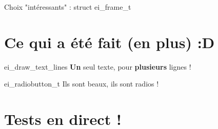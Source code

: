 \documentclass[10pt]{beamer}
\begin{document}
\begin{frame}{Choix "intéressants" : struct ei\_frame\_t}
    \begin{center}
        
    \end{center}
\end{frame}

\section{Ce qui a été fait (en plus) :D}

\begin{frame}{ei\_draw\_text\_lines}
    \textbf{Un} seul texte, pour \textbf{plusieurs} lignes !
\end{frame}


\begin{frame}{ei\_radiobutton\_t}
    Ils sont beaux, ils sont radios !
\end{frame}

\section{Tests en direct !}

\end{document}
